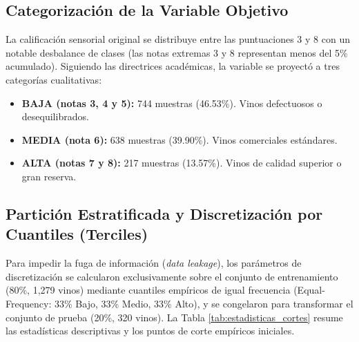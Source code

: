 \documentclass[11pt,a4paper]{article}
\begin{document}
\subsection{Categorización de la Variable Objetivo}
La calificación sensorial original se distribuye entre las puntuaciones 3 y 8 con un notable desbalance de clases (las notas extremas 3 y 8 representan menos del 5\% acumulado). Siguiendo las directrices académicas, la variable se proyectó a tres categorías cualitativas:
\begin{itemize}[noitemsep]
    \item \textbf{BAJA (notas 3, 4 y 5):} 744 muestras (46.53\%). Vinos defectuosos o desequilibrados.
    \item \textbf{MEDIA (nota 6):} 638 muestras (39.90\%). Vinos comerciales estándares.
    \item \textbf{ALTA (notas 7 y 8):} 217 muestras (13.57\%). Vinos de calidad superior o gran reserva.
\end{itemize}

\subsection{Partición Estratificada y Discretización por Cuantiles (Terciles)}
Para impedir la fuga de información (\textit{data leakage}), los parámetros de discretización se calcularon exclusivamente sobre el conjunto de entrenamiento (80\%, 1,279 vinos) mediante cuantiles empíricos de igual frecuencia (Equal-Frequency: 33\% Bajo, 33\% Medio, 33\% Alto), y se congelaron para transformar el conjunto de prueba (20\%, 320 vinos). La Tabla \ref{tab:estadisticas_cortes} resume las estadísticas descriptivas y los puntos de corte empíricos iniciales.
\end{document}
